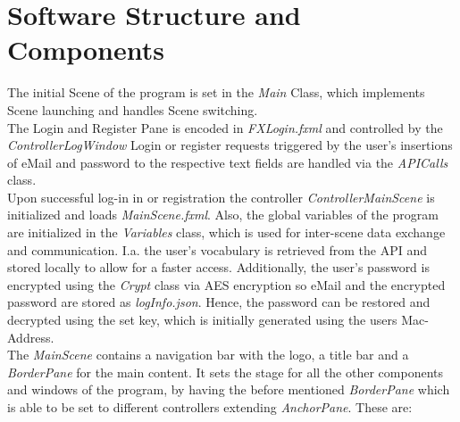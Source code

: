 


\section{Software Structure and Components}
The initial Scene of the program is set in the \textit{Main} Class, which implements Scene launching and handles Scene switching.\\
The Login and Register Pane is encoded in \textit{FXLogin.fxml} and controlled by the 
\textit{ControllerLogWindow}
Login or register requests triggered by the user's insertions of eMail and password to the respective text fields are handled via the \textit{APICalls} class.\\
Upon successful log-in in or registration the controller \textit{ControllerMainScene} is initialized and loads \textit{MainScene.fxml}. Also, the global variables of the program are initialized in the \textit{Variables} class, which is used for inter-scene data exchange and communication. I.a. the user's vocabulary is retrieved from the API and stored locally to allow for a faster access.
Additionally, the user's password is encrypted using the \textit{Crypt} class via AES encryption so eMail and the encrypted password are stored as \textit{logInfo.json}. Hence, the password can be restored and decrypted using the set key, which is initially generated using the users Mac-Address.\\
The \textit{MainScene} contains a navigation bar with the logo, a title bar and a \textit{BorderPane} for the main content.
It sets the stage for all the other components and windows of the program, by having the before mentioned \textit{BorderPane} which is able to be set to different controllers extending \textit{AnchorPane}. These are:
